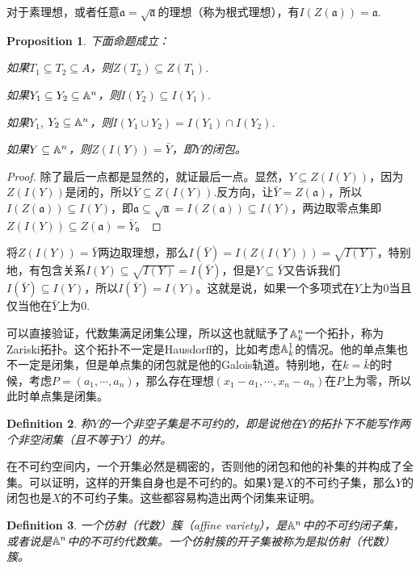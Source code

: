 \documentclass[9pt]{extarticle}
\theoremstyle{plain}%
\newtheorem{defi}{Definition}[section]%
\newtheorem{pro}[defi]{Proposition}%
\begin{document}
对于素理想，或者任意$\mathfrak{a}=\sqrt{\mathfrak{a}}$的理想（称为根式理想），有$I(Z(\mathfrak{a}))=\mathfrak{a}$.

\begin{pro}
下面命题成立：

 如果$T_1\subseteq T_2 \subseteq A$，则$Z(T_2)\subseteq Z(T_1)$.

 如果$Y_1\subseteq Y_2 \subseteq \mathbb{A}^n$，则$I(Y_2)\subseteq I(Y_1)$.

 如果$Y_1$, $Y_2 \subseteq \mathbb{A}^n$，则$I(Y_1\cup Y_2)=I(Y_1)\cap I(Y_2)$.

 如果$Y \subseteq \mathbb{A}^n$，则$Z(I(Y))=\bar{Y}$，即$Y$的闭包。
\end{pro}
\begin{proof}
除了最后一点都是显然的，就证最后一点。显然，$Y\subseteq Z(I(Y))$，因为$Z(I(Y))$是闭的，所以$\bar{Y}\subseteq Z(I(Y))$.反方向，让$\bar{Y}=Z(\mathfrak{a})$，所以$I(Z(\mathfrak{a}))\subseteq I(Y)$，即$\mathfrak{a}\subseteq \sqrt{\mathfrak{a}}=I(Z(\mathfrak{a}))\subseteq I(Y)$，两边取零点集即$Z(I(Y))\subseteq Z(\mathfrak{a})=\bar{Y}$。
\end{proof}
将$Z(I(Y))=\bar{Y}$两边取理想，那么$I(\bar{Y})=I(Z(I(Y)))=\sqrt{I(Y)}$，特别地，有包含关系$I(Y)\subseteq\sqrt{I(Y)}=I(\bar{Y})$，但是$Y\subseteq \bar{Y}$又告诉我们$I(\bar{Y})\subseteq I(Y)$，所以$I(\bar{Y})=I(Y)$。这就是说，如果一个多项式在$Y$上为$0$当且仅当他在$\bar{Y}$上为$0$.

可以直接验证，代数集满足闭集公理，所以这也就赋予了$\mathbb{A}^n_k$一个拓扑，称为Zariski拓扑。这个拓扑不一定是Hausdorff的，比如考虑$\mathbb{A}^1_k$的情况。他的单点集也不一定是闭集，但是单点集的闭包就是他的Galois轨道。特别地，在$k=\bar{k}$的时候，考虑$P=(a_1,\cdots ,a_n)$，那么存在理想$(x_1-a_1,\cdots,x_n-a_n)$在$P$上为零，所以此时单点集是闭集。

\begin{defi}
称$Y$的一个非空子集是不可约的，即是说他在$Y$的拓扑下不能写作两个非空闭集（且不等于$Y$）的并。
\end{defi}
在不可约空间内，一个开集必然是稠密的，否则他的闭包和他的补集的并构成了全集。可以证明，这样的开集自身也是不可约的。如果$Y$是$X$的不可约子集，那么$Y$的闭包也是$X$的不可约子集。这些都容易构造出两个闭集来证明。
 
\begin{defi}
一个仿射（代数）簇（affine variety），是$\mathbb{A}^n$中的不可约闭子集，或者说是$\mathbb{A}^n$中的不可约代数集。一个仿射簇的开子集被称为是拟仿射（代数）簇。
\end{defi}
\end{document}
